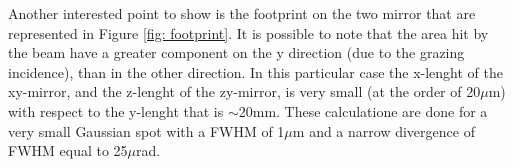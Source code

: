 Another interested point to show is the footprint on the two mirror that are represented in Figure \ref{fig: footprint}. It is possible to note that the area hit by the beam have a greater component on the y direction (due to the grazing incidence), than in the other direction. In this particular case the x-lenght of the xy-mirror, and the z-lenght of the zy-mirror, is very small (at the order of 20$\mu $m) with respect to the y-lenght that is $\sim $20mm. These calculatione are done for a very small Gaussian spot with a FWHM of 1$\mu $m and a narrow divergence of FWHM equal to 25$\mu $rad.